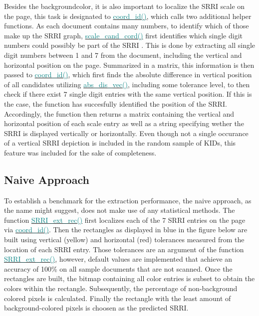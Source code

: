 \documentclass[aodsor,preprint]{imsart}
\numberwithin{equation}{section}
\theoremstyle{plain}
\begin{document}
Besides the backgroundcolor, it is also important to localize the SRRI scale on the page, this task is designated to \href{https://github.com/Base-R-Best-R/KID/blob/main/Code/Package/KIDs/R/background_col_id.R}{\textcolor{teal}{coord\_id()}}, which calls two additional helper functions. As each document contains many numbers, to identify which of those make up the SRRI graph, \href{https://github.com/Base-R-Best-R/KID/blob/main/Code/Package/KIDs/R/scale_cand_coord.R}{\textcolor{teal}{scale\_cand\_cord()}} first identifies which single digit numbers could possibly be part of the SRRI \citep{pdftools}. This is done by extracting all single digit numbers between 1 and 7 from the document, including the vertical and horizontal position on the page. Summarized in a matrix, this information is then passed to \href{https://github.com/Base-R-Best-R/KID/blob/main/Code/Package/KIDs/R/coord_id.R}{\textcolor{teal}{coord\_id()}}, which first finds the absolute difference in vertical position of all candidates utilizing \href{https://github.com/Base-R-Best-R/KID/blob/main/Code/Package/KIDs/R/abs_dis_vec.R}{\textcolor{teal}{abs\_dis\_vec()}}, including some tolerance level, to then check if there exist 7 single digit entries with the same vertical position. If this is the case, the function has succesfully identified the position of the SRRI. Accordingly, the function then returns a matrix containing the vertical and horizontal position of each scale entry as well as a string specifying wether the SRRI is displayed vertically or horizontally. Even though not a single occurance of a vertical SRRI depiction is included in the random sample of KIDs, this feature was included for the sake of completeness.

\subsection{Naive Approach}
To establish a benchmark for the extraction performance, the naive approach, as the name might suggest, does not make use of any statistical methods. The function \href{https://github.com/Base-R-Best-R/KID/blob/main/Code/Package/KIDs/R/SRRI_ext_rec.R}{\textcolor{teal}{SRRI\_ext\_rec()}} first localizes each of the 7 SRRI entries on the page via \href{https://github.com/Base-R-Best-R/KID/blob/main/Code/Package/KIDs/R/coord_id.R}{\textcolor{teal}{coord\_id()}}. Then the rectangles as displayed in blue in the figure below are built using vertical (yellow) and horizontal (red) tolerances measured from the location of each SRRI entry. Those tolerances are an argument of the function \href{https://github.com/Base-R-Best-R/KID/blob/main/Code/Package/KIDs/R/SRRI_ext_rec.R}{\textcolor{teal}{SRRI\_ext\_rec()}}, however, default values are implemented that achieve an accuracy of 100\% on all sample documents that are not scanned. Once the rectangles are built, the bitmap containing all color entries is subset to obtain the colors within the rectangle. Subsequently, the percentage of non-background colored pixels is calculated. Finally the rectangle with the least amount of background-colored pixels is choosen as the predicted SRRI.
\end{document}
